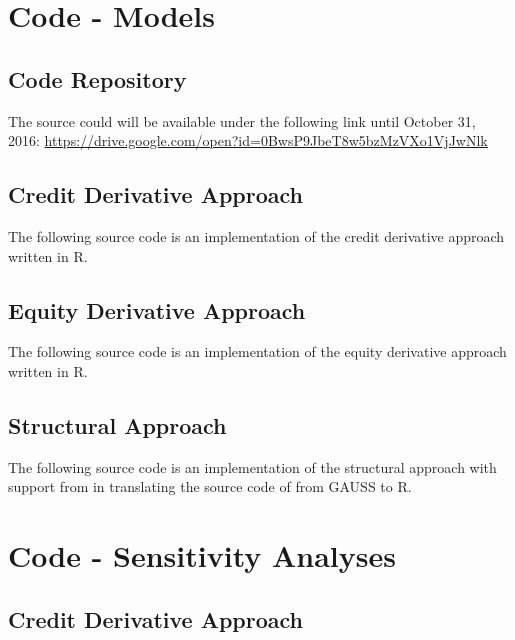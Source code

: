 \chapter{Code - Models} \label{creditderivativeapproach}
\section{Code Repository}
The source could will be available under the following link until October 31, 2016: \url{https://drive.google.com/open?id=0BwsP9JbeT8w5bzMzVXo1VjJwNlk}

\section{Credit Derivative Approach} \label{creditderivativeapproach}

The following source code is an implementation of the credit derivative approach \citep{de2011pricing} written in R.
 


\section{Equity Derivative Approach} \label{equityderivativeapproach}

The following source code is an implementation of the equity derivative approach \citep{de2011pricing} written in R.
 


\section{Structural Approach} \label{structuralapproach}

The following source code is an implementation of the structural approach \citep{pennacchi2010structural} with support from \citet{codestructrural} in translating the source code of \citet{pennacchi2010structural} from GAUSS to R.
 


\chapter{Code - Sensitivity Analyses}

\section{Credit Derivative Approach} \label{sensicredit}

